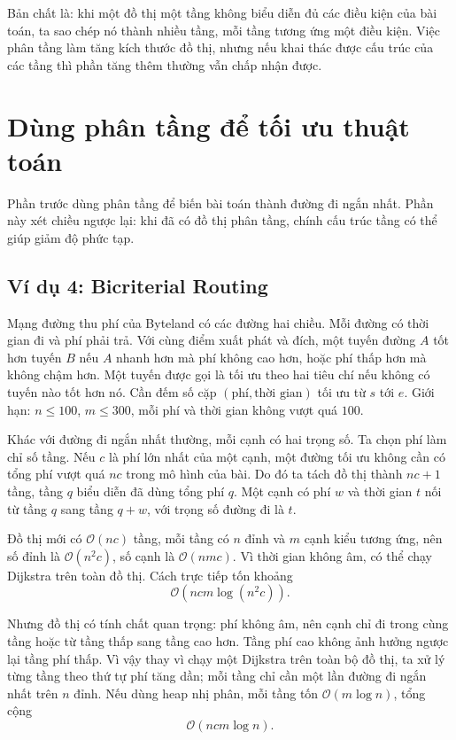 \documentclass[11pt]{article}
\newcommand{\Oh}{\mathcal{O}}
\begin{document}
Bản chất là: khi một đồ thị một tầng không biểu diễn đủ các điều kiện của bài
toán, ta sao chép nó thành nhiều tầng, mỗi tầng tương ứng một điều kiện. Việc
phân tầng làm tăng kích thước đồ thị, nhưng nếu khai thác được cấu trúc của
các tầng thì phần tăng thêm thường vẫn chấp nhận được.

\section{Dùng phân tầng để tối ưu thuật toán}

Phần trước dùng phân tầng để biến bài toán thành đường đi ngắn nhất. Phần này
xét chiều ngược lại: khi đã có đồ thị phân tầng, chính cấu trúc tầng có thể
giúp giảm độ phức tạp.

\subsection{Ví dụ 4: Bicriterial Routing}

Mạng đường thu phí của Byteland có các đường hai chiều. Mỗi đường có thời gian
đi và phí phải trả. Với cùng điểm xuất phát và đích, một tuyến đường \(A\) tốt
hơn tuyến \(B\) nếu \(A\) nhanh hơn mà phí không cao hơn, hoặc phí thấp hơn mà
không chậm hơn. Một tuyến được gọi là tối ưu theo hai tiêu chí nếu không có
tuyến nào tốt hơn nó. Cần đếm số cặp \((\text{phí},\text{thời gian})\) tối ưu
từ \(s\) tới \(e\). Giới hạn: \(n\le 100\), \(m\le 300\), mỗi phí và thời gian
không vượt quá \(100\).

Khác với đường đi ngắn nhất thường, mỗi cạnh có hai trọng số. Ta chọn phí làm
chỉ số tầng. Nếu \(c\) là phí lớn nhất của một cạnh, một đường tối ưu không
cần có tổng phí vượt quá \(nc\) trong mô hình của bài. Do đó ta tách đồ thị
thành \(nc+1\) tầng, tầng \(q\) biểu diễn đã dùng tổng phí \(q\). Một cạnh có
phí \(w\) và thời gian \(t\) nối từ tầng \(q\) sang tầng \(q+w\), với trọng số
đường đi là \(t\).

Đồ thị mới có \(\Oh(nc)\) tầng, mỗi tầng có \(n\) đỉnh và \(m\) cạnh kiểu
tương ứng, nên số đỉnh là \(\Oh(n^2c)\), số cạnh là \(\Oh(nmc)\). Vì thời gian
không âm, có thể chạy Dijkstra trên toàn đồ thị. Cách trực tiếp tốn khoảng
\[
  \Oh(ncm\log(n^2c)).
\]

Nhưng đồ thị có tính chất quan trọng: phí không âm, nên cạnh chỉ đi trong cùng
tầng hoặc từ tầng thấp sang tầng cao hơn. Tầng phí cao không ảnh hưởng ngược
lại tầng phí thấp. Vì vậy thay vì chạy một Dijkstra trên toàn bộ đồ thị, ta
xử lý từng tầng theo thứ tự phí tăng dần; mỗi tầng chỉ cần một lần đường đi
ngắn nhất trên \(n\) đỉnh. Nếu dùng heap nhị phân, mỗi tầng tốn
\(\Oh(m\log n)\), tổng cộng
\[
  \Oh(ncm\log n).
\]
\end{document}
